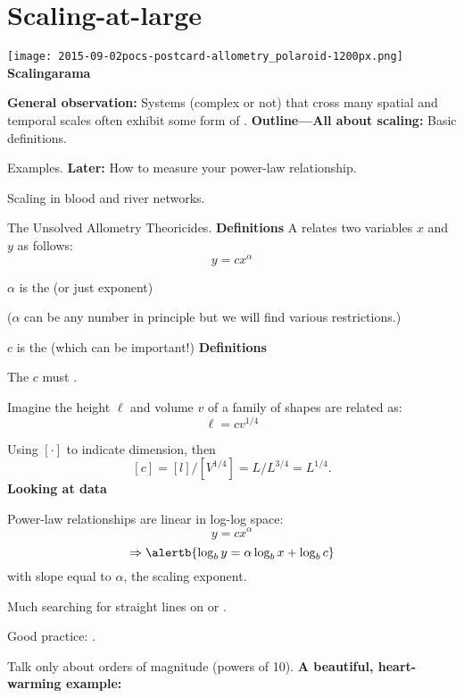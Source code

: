 \section{Scaling-at-large}
  \texttt{[image: 2015-09-02pocs-postcard-allometry\_polaroid-1200px.png]}
  \textbf{Scalingarama}

  \textbf{General observation:}
    Systems (complex or not) 
    that cross many spatial and temporal scales
    often exhibit some form of .
  \textbf{Outline---All about scaling:}
      Basic definitions.
    
      Examples.
  \textbf{Later:}
      How to measure your power-law relationship.
    
      Scaling in blood and river networks.
    
      The Unsolved Allometry Theoricides.
  \textbf{Definitions}
    A  relates two
    variables $x$ and $y$ as follows:
    {\Large
      $$ y = c x^\alpha $$
    }
  
      $\alpha$ is the  (or just exponent)
     
      ($\alpha$ can be any number in principle but we will
      find various restrictions.)
     
      $c$ is the  (which can be important!)
  \textbf{Definitions}
    
    
      The  $c$ must .
    
      Imagine the height $\ell$ and volume $v$ of 
      a family of shapes
      are related as:
      $$\ell = c v^{1/4}$$
    
      Using $[ \cdot ]$ to indicate dimension, then 
      $$[c] = [l]/[V^{1/4}] = L/L^{3/4} = L^{1/4}.$$
  \textbf{Looking at data}
    
    
      Power-law relationships
      are linear in log-log space:
      $$y = c x^\alpha $$
      $$ \Rightarrow \alertb{\log_{b} y = \alpha \log_{b} x + \log_{b} c} $$
      with slope equal to $\alpha$, the scaling exponent.
     
      Much searching for straight lines on 
       or .
     
      Good practice: .
     
      Talk only about orders of magnitude (powers of 10).
  \textbf{A beautiful, heart-warming example:}
    
